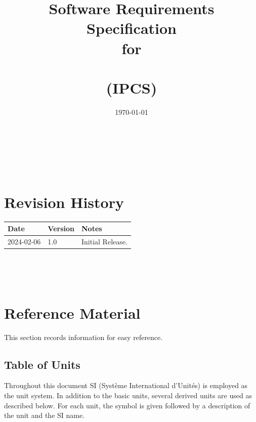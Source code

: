 \documentclass[12pt]{article}
\begin{document}
\title{Software Requirements Specification \\ for \\ \progname \\ (IPCS)} 
\author{\authname}
\date{\today}
	
\maketitle

~\newpage


\tableofcontents

~\newpage

\section*{Revision History}

\begin{tabularx}{\textwidth}{p{3cm}p{2cm}X}
\toprule {\bf Date} & {\bf Version} & {\bf Notes}\\
\midrule
2024-02-06 & 1.0 & Initial Release.\\
\bottomrule
\end{tabularx}

~\\

~\newpage

\section{Reference Material}

This section records information for easy reference.

\subsection{Table of Units}

Throughout this document SI (Syst\`{e}me International d'Unit\'{e}s) is employed
as the unit system.  In addition to the basic units, several derived units are
used as described below.  For each unit, the symbol is given followed by a
description of the unit and the SI name.
~\newline
\end{document}
